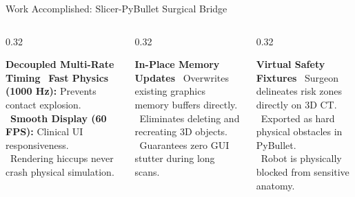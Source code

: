 \documentclass{if-beamer}
\begin{document}
\begin{frame}{Work Accomplished: Slicer-PyBullet Surgical Bridge}

    \vspace{0.25cm}
    \begin{columns}[T]
        \begin{column}{0.32\textwidth}
            \begin{block}{\centering \textbf{Decoupled Multi-Rate Timing}}
                \footnotesize
                \textbullet\ \textbf{Fast Physics (1000 Hz):} Prevents contact explosion.\\
                \textbullet\ \textbf{Smooth Display (60 FPS):} Clinical UI responsiveness.\\
                \textbullet\ Rendering hiccups never crash physical simulation.
            \end{block}
        \end{column}
        \begin{column}{0.32\textwidth}
            \begin{block}{\centering \textbf{In-Place Memory Updates}}
                \footnotesize
                \textbullet\ Overwrites existing graphics memory buffers directly.\\
                \textbullet\ Eliminates deleting and recreating 3D objects.\\
                \textbullet\ Guarantees zero GUI stutter during long scans.
            \end{block}
        \end{column}
        \begin{column}{0.32\textwidth}
            \begin{block}{\centering \textbf{Virtual Safety Fixtures}}
                \footnotesize
                \textbullet\ Surgeon delineates risk zones directly on 3D CT.\\
                \textbullet\ Exported as hard physical obstacles in PyBullet.\\
                \textbullet\ Robot is physically blocked from sensitive anatomy.
            \end{block}
        \end{column}
    \end{columns}
\end{frame}
\end{document}
